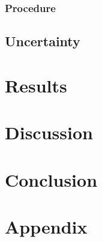 \documentclass{article}
\begin{document}
\subsubsection{Procedure}


\subsection{Uncertainty}



\section{Results}


\section{Discussion}



\section{Conclusion}


\newpage
\section{Appendix}


\newpage
\begin{thebibliography}{9}

\end{thebibliography}
\end{document}
